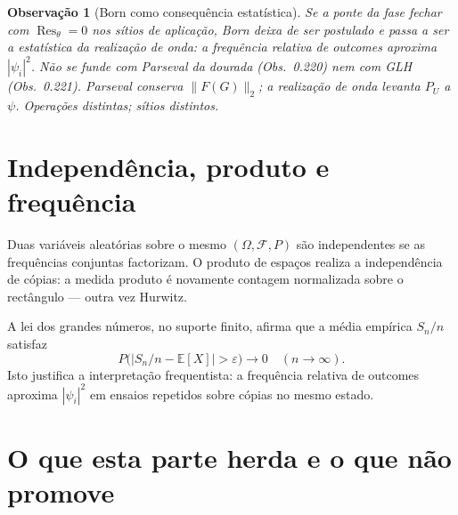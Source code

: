 \documentclass[11pt,a4paper]{article}
\newtheorem{observacao}[teorema]{Observação}
\begin{document}
\begin{observacao}[Born como consequência estatística]
\label{obs:born-nao-axioma}
Se a ponte da fase fechar com $\operatorname{Res}_\theta=0$ nos sítios de aplicação,
Born deixa de ser postulado e passa a ser a estatística da realização de onda:
a frequência relativa de outcomes aproxima $|\psi_i|^2$.
Não se funde com Parseval da dourada (Obs.~0.220) nem com GLH (Obs.~0.221).
Parseval conserva $\|F(G)\|_2$; a realização de onda levanta $P_U$ a $\psi$.
Operações distintas; sítios distintos.
\end{observacao}

\section{Independência, produto e frequência}

Duas variáveis aleatórias sobre o mesmo $(\Omega,\mathcal{F},P)$ são independentes se as
frequências conjuntas factorizam. O produto de espaços realiza a independência de cópias:
a medida produto é novamente contagem normalizada sobre o rectângulo --- outra vez Hurwitz.

A lei dos grandes números, no suporte finito, afirma que a média empírica $S_n/n$ satisfaz
\[
P\bigl(\bigl|S_n/n-\mathbb{E}[X]\bigr|>\varepsilon\bigr)\to 0
\quad(n\to\infty).
\]
Isto justifica a interpretação frequentista: a frequência relativa de outcomes aproxima
$|\psi_i|^2$ em ensaios repetidos sobre cópias no mesmo estado.

\section{O que esta parte herda e o que não promove}
\end{document}
